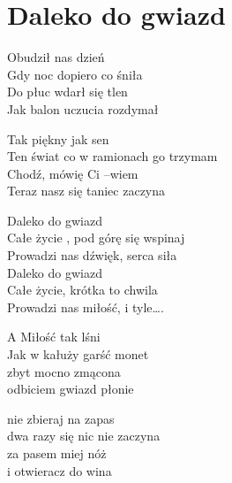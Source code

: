 \section{Daleko do gwiazd}
\begin{text}
Obudził nas dzień\\
Gdy noc dopiero co śniła\\
Do płuc wdarł się tlen\\
Jak balon uczucia rozdymał

Tak piękny jak sen\\
Ten świat co w ramionach go trzymam\\
Chodź, mówię Ci –wiem\\
Teraz nasz się taniec zaczyna

\vin Daleko do gwiazd\\
\vin Całe życie , pod górę się wspinaj\\
\vin Prowadzi nas dźwięk, serca siła\\
\vin Daleko do gwiazd\\
\vin Całe życie, krótka to chwila\\
\vin Prowadzi nas miłość, i tyle….

A Miłość tak lśni\\
Jak w kałuży garść monet\\
zbyt mocno zmącona\\
odbiciem gwiazd płonie

nie zbieraj na zapas\\
dwa razy się nic nie zaczyna\\
za pasem miej nóż\\
i otwieracz do wina
\end{text}